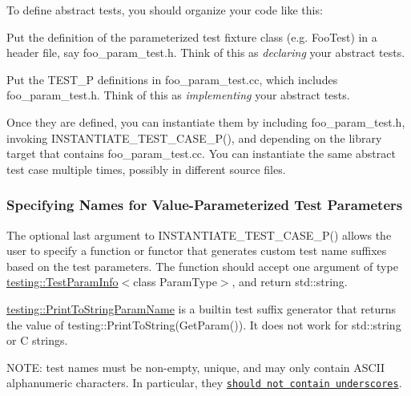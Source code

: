 To define abstract tests, you should organize your code like this\+:


\begin{DoxyEnumerate}
\item Put the definition of the parameterized test fixture class (e.\+g. {\ttfamily Foo\+Test}) in a header file, say {\ttfamily foo\+\_\+param\+\_\+test.\+h}. Think of this as {\itshape declaring} your abstract tests.
\end{DoxyEnumerate}
\begin{DoxyEnumerate}
\item Put the {\ttfamily T\+E\+S\+T\+\_\+P} definitions in {\ttfamily foo\+\_\+param\+\_\+test.\+cc}, which includes {\ttfamily foo\+\_\+param\+\_\+test.\+h}. Think of this as {\itshape implementing} your abstract tests.
\end{DoxyEnumerate}

Once they are defined, you can instantiate them by including {\ttfamily foo\+\_\+param\+\_\+test.\+h}, invoking {\ttfamily I\+N\+S\+T\+A\+N\+T\+I\+A\+T\+E\+\_\+\+T\+E\+S\+T\+\_\+\+C\+A\+S\+E\+\_\+\+P()}, and depending on the library target that contains {\ttfamily foo\+\_\+param\+\_\+test.\+cc}. You can instantiate the same abstract test case multiple times, possibly in different source files.

\subsubsection*{Specifying Names for Value-\/\+Parameterized Test Parameters}

The optional last argument to {\ttfamily I\+N\+S\+T\+A\+N\+T\+I\+A\+T\+E\+\_\+\+T\+E\+S\+T\+\_\+\+C\+A\+S\+E\+\_\+\+P()} allows the user to specify a function or functor that generates custom test name suffixes based on the test parameters. The function should accept one argument of type {\ttfamily \hyperlink{structtesting_1_1TestParamInfo}{testing\+::\+Test\+Param\+Info}$<$class Param\+Type$>$}, and return {\ttfamily std\+::string}.

{\ttfamily \hyperlink{structtesting_1_1PrintToStringParamName}{testing\+::\+Print\+To\+String\+Param\+Name}} is a builtin test suffix generator that returns the value of {\ttfamily testing\+::\+Print\+To\+String(\+Get\+Param())}. It does not work for {\ttfamily std\+::string} or C strings.

N\+O\+TE\+: test names must be non-\/empty, unique, and may only contain A\+S\+C\+II alphanumeric characters. In particular, they \href{https://g3doc.corp.google.com/third_party/googletest/googletest/g3doc/faq.md#no-underscores}{\tt should not contain underscores}.


